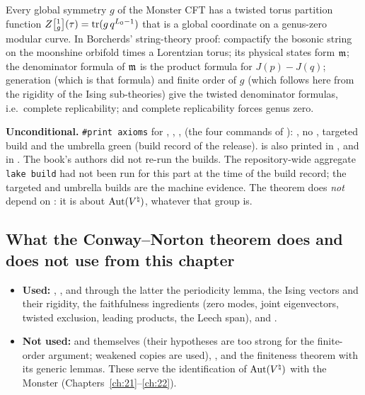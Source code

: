 \begin{physics}
Every global symmetry $g$ of the Monster CFT has a twisted torus partition function $Z\bigl[{}^{1}_{g}\bigr](\tau)=\operatorname{tr}(g\,q^{L_0-1})$
that is a global coordinate on a genus-zero modular curve.  In Borcherds' string-theory proof: compactify the bosonic
string on the moonshine orbifold times a Lorentzian torus; its physical states form $\mathfrak m$; the denominator formula of
$\mathfrak m$ is the product formula for $J(p)-J(q)$; generation (which is that formula) and finite order of $g$ (which follows
here from the rigidity of the Ising sub-theories) give the twisted denominator formulas, i.e.\ complete replicability; and
complete replicability forces genus zero.
\end{physics}
\begin{status}
\textbf{Unconditional.}  \texttt{\#print axioms} for , ,
,  (the four commands of
): , no ,
targeted build and the umbrella  green (build record of the release).
 is also printed in , and
 in .  The book's authors did not
re-run the builds.  The repository-wide aggregate \texttt{lake build} had not been run for this part at the time of the
build record; the targeted and umbrella builds are the machine evidence.  The theorem
does \emph{not} depend on : it is about $\operatorname{Aut}({V^{\natural}})$, whatever that group is.
\end{status}

\subsection{What the Conway--Norton theorem does and does not use from this chapter}

\begin{itemize}
\item \textbf{Used:} , , and through the latter the
  periodicity lemma, the Ising vectors and their rigidity, the faithfulness ingredients (zero modes, joint eigenvectors,
  twisted exclusion, leading products, the Leech span), and .
\item \textbf{Not used:}  and  themselves (their
  hypotheses are too strong for the finite-order argument; weakened copies are used), ,
  and the finiteness theorem  with its generic lemmas.  These serve the identification of $\operatorname{Aut}({V^{\natural}})$
  with the Monster (Chapters~\ref{ch:21}--\ref{ch:22}).
\end{itemize}

